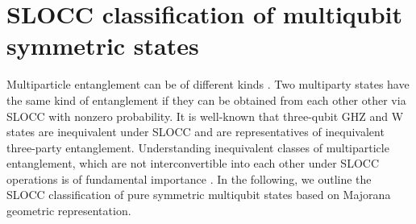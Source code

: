 \section{SLOCC classification of multiqubit symmetric states}\label{classification}

Multiparticle entanglement  can be of different kinds \cite{Dur}. Two multiparty states have the same kind of entanglement if they can be obtained from each other other via SLOCC with nonzero probability. It is well-known that three-qubit GHZ and W states are inequivalent under SLOCC and are representatives of inequivalent three-party entanglement. Understanding  inequivalent classes of multiparticle entanglement, which are not interconvertible into each other under SLOCC operations is of fundamental importance \cite{Dur,Ver,Lamata,solano}. In the following, we outline \cite{solano} the SLOCC classification of pure symmetric multiqubit states based on Majorana geometric representation.

